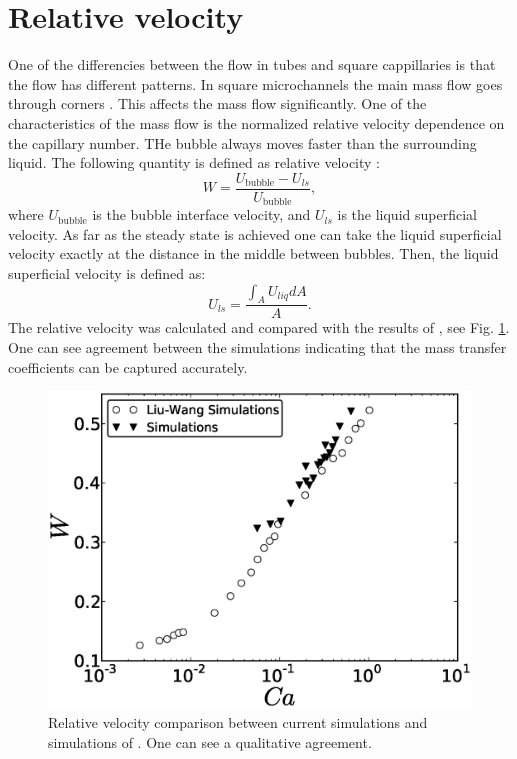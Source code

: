 \documentclass{article}
\begin{document}
\section{Relative velocity}
One of the differencies between the flow in tubes and square cappillaries is that the flow has
different patterns. In square microchannels the main mass flow goes through corners
\cite{heil-threedim,wang-non-circular}. This affects the mass flow significantly. One of the
characteristics of the mass flow is the normalized relative velocity dependence on the capillary
number. THe bubble always moves faster than the surrounding liquid. The following quantity is defined as
relative velocity \cite{cerro-bubble-train}:
\begin{equation}
W=\frac{U_{\mathrm{bubble}}-U_{ls}}{U_{\mathrm{bubble}}},
\end{equation}
where $U_{\mathrm{bubble}}$ is the bubble interface velocity, and $U_{ls}$ is the liquid superficial
velocity. As far as the steady state is achieved one can take the liquid superficial velocity
exactly at the distance in the middle between bubbles. Then, the liquid superficial velocity is
defined as:
\begin{equation}
U_{ls}=\frac{\int_{A}{U_{liq}dA}}{A}.
\end{equation}
The relative velocity was calculated and compared with the results of \citet{wang-non-circular},
see Fig. \ref{fig:relative:velocity}. One can see agreement between the simulations indicating that
the mass transfer coefficients can be captured accurately. 
\begin{figure}[ht]
\includegraphics[width=\textwidth]{Figures/relative_velocity.eps}
\caption{Relative velocity comparison between current simulations and simulations of
\citet{wang-non-circular}. One can see a qualitative agreement. \label{fig:relative:velocity}}
\end{figure}
\end{document}
